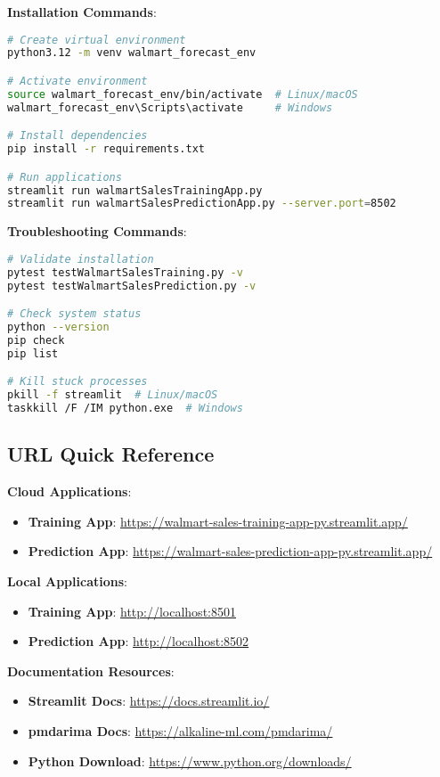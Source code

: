 \textbf{Installation Commands}:
\begin{lstlisting}[language=bash,basicstyle=\color{blue}]
# Create virtual environment
python3.12 -m venv walmart_forecast_env

# Activate environment
source walmart_forecast_env/bin/activate  # Linux/macOS
walmart_forecast_env\Scripts\activate     # Windows

# Install dependencies
pip install -r requirements.txt

# Run applications
streamlit run walmartSalesTrainingApp.py
streamlit run walmartSalesPredictionApp.py --server.port=8502
\end{lstlisting}

\textbf{Troubleshooting Commands}:
\begin{lstlisting}[language=bash,basicstyle=\color{blue}]
# Validate installation
pytest testWalmartSalesTraining.py -v
pytest testWalmartSalesPrediction.py -v

# Check system status
python --version
pip check
pip list

# Kill stuck processes
pkill -f streamlit  # Linux/macOS
taskkill /F /IM python.exe  # Windows
\end{lstlisting}

\subsection{URL Quick Reference}

\textbf{Cloud Applications}:
\begin{itemize}
    \item \textbf{Training App}: \url{https://walmart-sales-training-app-py.streamlit.app/}
    \item \textbf{Prediction App}: \url{https://walmart-sales-prediction-app-py.streamlit.app/}
\end{itemize}

\textbf{Local Applications}:
\begin{itemize}
    \item \textbf{Training App}: \url{http://localhost:8501}
    \item \textbf{Prediction App}: \url{http://localhost:8502}
\end{itemize}

\textbf{Documentation Resources}:
\begin{itemize}
    \item \textbf{Streamlit Docs}: \url{https://docs.streamlit.io/}
    \item \textbf{pmdarima Docs}: \url{https://alkaline-ml.com/pmdarima/}
    \item \textbf{Python Download}: \url{https://www.python.org/downloads/}
\end{itemize}

